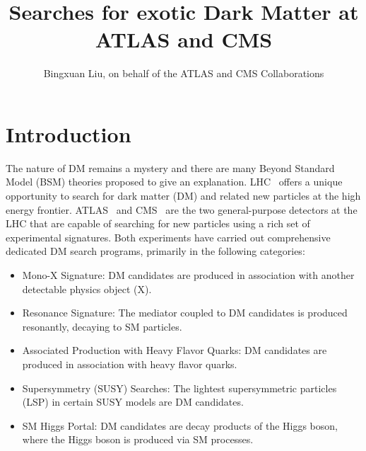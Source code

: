 \documentclass{moriond}
\begin{document}
\vspace*{0cm}
\title{Searches for exotic Dark Matter at ATLAS and CMS}


\author{Bingxuan Liu, on behalf of the ATLAS and CMS Collaborations}

\address{Department of Physics, Simon Fraser University, Vancouver, Canada}

\maketitle{}

\section{Introduction}

The nature of DM remains a mystery and there are many Beyond Standard Model
(BSM) theories proposed to give an explanation. LHC~\cite{LHCRef} offers a
unique opportunity to search for dark matter (DM) and related new particles at
the high energy frontier. ATLAS~\cite{ATLASRef} and CMS~\cite{CMSRef} are the
two general-purpose detectors at the LHC that are capable of searching for new
particles using a rich set of experimental signatures. Both experiments have carried out
comprehensive dedicated DM search programs, primarily in the following
categories: 

\begin{itemize}
\item Mono-X Signature: DM candidates are produced in association with another detectable physics object (X). 
\item Resonance Signature: The mediator coupled to DM candidates is produced resonantly, decaying to SM particles.
\item Associated Production with Heavy Flavor Quarks: DM candidates are produced in association with heavy flavor quarks.
\item Supersymmetry (SUSY) Searches: The lightest supersymmetric particles (LSP) in certain SUSY models are DM candidates.
\item SM Higgs Portal: DM candidates are decay products of the Higgs boson, where the Higgs boson is produced via SM processes. 
\end{itemize}    
\end{document}
